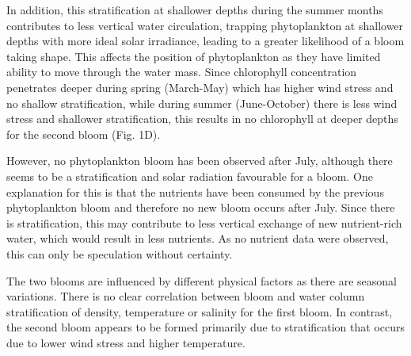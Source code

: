 \documentclass[../Main.tex]{subfiles}
\begin{document}
In addition, this stratification at shallower depths during the summer months contributes to less vertical water circulation, trapping phytoplankton at shallower depths with more ideal solar irradiance, leading to a greater likelihood of a bloom taking shape. This affects the position of phytoplankton as they have limited ability to move through the water mass\supercite{kase2018phytoplankton}.
Since chlorophyll concentration penetrates deeper during spring (March-May) which has higher wind stress and no shallow stratification, while during summer (June-October) there is less wind stress and shallower stratification, this results in no chlorophyll at deeper depths for the second bloom (Fig. 1D).

However, no phytoplankton bloom has been observed after July, although there seems to be a stratification and solar radiation favourable for a bloom. One explanation for this is that the nutrients have been consumed by the previous phytoplankton bloom and therefore no new bloom occurs after July. Since there is stratification, this may contribute to less vertical exchange of new nutrient-rich water, which would result in less nutrients. As no nutrient data were observed, this can only be speculation without certainty. 

The two blooms are influenced by different physical factors as there are seasonal variations. There is no clear correlation between bloom and water column stratification of density, temperature or salinity for the first bloom. In contrast, the second bloom appears to be formed primarily due to stratification that occurs due to lower wind stress and higher temperature. 
\end{document}
